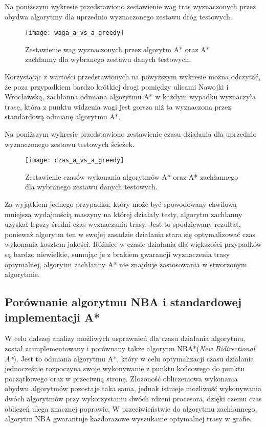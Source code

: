 Na poniższym wykresie przedstawiono zestawienie wag tras wyznaczonych przez obydwa algorytmy dla uprzednio wyznaczonego zestawu dróg testowych.

\begin{figure}[H]
\centering
\texttt{[image: waga\_a\_vs\_a\_greedy]}
\caption{Zestawienie wag wyznaczonych przez algorytm A* oraz A* zachłanny dla wybranego zestawu danych testowych.}
\end{figure}

Korzystając z wartości przedstawionych na powyższym wykresie można odczytać, że poza przypadkiem bardzo krótkiej drogi pomiędzy ulicami Nawojki i Wrocławską, zachłanna odmiana algorytmu A* w każdym wypadku wyznaczyła trasę, która z punktu widzenia wagi jest gorsza niż ta wyznaczona przez standardową odmianę algorytmu A*.

Na poniższym wykresie przedstawiono zestawienie czasu działania dla uprzednio wyznaczonego zestawu testowych ścieżek.

\begin{figure}[H]
\centering
\texttt{[image: czas\_a\_vs\_a\_greedy]}
\caption{Zestawienie czasów wykonania algorytmów A* oraz A* zachłannego dla wybranego zestawu danych testowych.}
\end{figure}

Za wyjątkiem jednego przypadku, który może być spowodowany chwilową mniejszą wydajnością maszyny na której działały testy, algorytm zachłanny uzyskał lepszy średni czas wyznaczania trasy. Jest to spodziewany rezultat, ponieważ algorytm ten w swojej zasadzie działania stara się optymalizować czas wykonania kosztem jakości. Różnice w czasie działania dla większości przypadków są bardzo niewielkie, sumując je z brakiem gwarancji wyznaczenia trasy optymalnej, algorytm zachłanny A* nie znajduje zastosowania w stworzonym algorytmie.

\subsection{Porównanie algorytmu NBA i standardowej implementacji A*}

W celu dalszej analizy możliwych usprawnień dla czasu działania algorytmu, został zaimplementowany i porównany także algorytm NBA*(\textit{New Bidirectional A*}). Jest to odmiana algorytmu A*, który w celu optymalizacji czasu działania jednocześnie rozpoczyna swoje wykonywanie z punktu końcowego do punktu początkowego oraz w przeciwną stronę. Złożoność obliczeniowa wykonania obydwu algorytmów pozostaje taka sama, jednak istnieje możliwość wykonywania dwóch algorytmów przy wykorzystaniu dwóch rdzeni procesora, dzięki czemu czas obliczeń ulega znacznej poprawie. W przeciwieństwie do algorytmu zachłannego, algorytm NBA gwarantuje każdorazowe wyszukanie optymalnej trasy w grafie.

